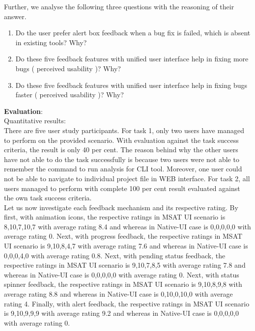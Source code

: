 Further, we analyse the following three questions with the reasoning of their answer. \\

\begin{enumerate}
\item Do the user prefer alert box feedback when a bug fix is failed, which is absent in existing tools? Why?
\item Do these five feedback features with unified user interface help in fixing more bugs ( perceived usability )? Why?
\item Do these five feedback features with unified user interface help in fixing bugs faster ( perceived usability )? Why? \\
\end{enumerate}

\textbf{Evaluation}: \\

Quantitative results: \\

There are five user study participants. For task 1, only two users have managed to perform on the provided scenario. With evaluation against the task success criteria, the result is only 40 per cent. The reason behind why the other users have not able to do the task successfully is because two users were not able to remember the command to run analysis for CLI tool. Moreover, one user could not be able to navigate to individual project file in WEB interface. For task 2, all users managed to perform with complete 100 per cent result evaluated against the own task success criteria. \\

Let us now investigate each feedback mechanism and its respective rating. By first, with animation icons, the respective ratings in MSAT UI scenario is 8,10,7,10,7 with average rating 8.4 and whereas in Native-UI case is 0,0,0,0,0 with average rating 0. Next, with progress feedback, the respective ratings in MSAT UI scenario is 9,10,8,4,7 with average rating 7.6 and whereas in Native-UI case is 0,0,0,4,0 with average rating 0.8. Next, with pending status feedback, the respective ratings in MSAT UI scenario is 9,10,7,8,5 with average rating 7.8 and whereas in Native-UI case is 0,0,0,0,0 with average rating 0. Next, with status spinner feedback, the respective ratings in MSAT UI scenario is 9,10,8,9,8 with average rating 8.8 and whereas in Native-UI case is 0,10,0,10,0 with average rating 4. Finally, with alert feedback, the respective ratings in MSAT UI scenario is 9,10,9,9,9 with average rating 9.2 and whereas in Native-UI case is 0,0,0,0,0 with average rating 0. \\


